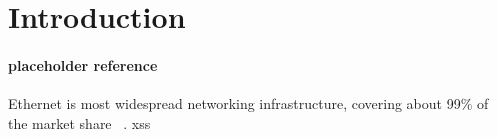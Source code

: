 \section{Introduction}

\paragraph{placeholder reference}
Ethernet is most widespread networking infrastructure, covering about
99\% of the market share ~\cite{Feng2003}.
xss
